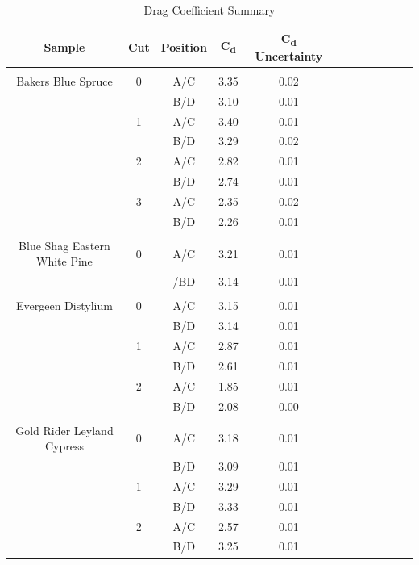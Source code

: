 \documentclass[12pt]{article}
\begin{document}
\begin{table}
\centering
\caption{Drag Coefficient Summary}
\label{tab:SumTable}
	\small
	\begin{tabular}{cccccccccccc}
			\hline
\textbf{Sample}	&	\textbf{Cut}	& 	\textbf{Position}	&	\textbf{C\textsubscript{d}}	&	\textbf{C\textsubscript{d} Uncertainty}	&	\\	\hline
		&		&			&				&						&	\\	
Bakers Blue Spruce	&	0	& 	A/C	&	3.35	&	0.02	&	\\	
	&		& 	B/D	&	3.10	&	0.01	&	\\	
	&	1	& 	A/C	&	3.40	&	0.01	&	\\	
	&		& 	B/D	&	3.29	&	0.02	&	\\	
	&	2	& 	A/C	&	2.82	&	0.01	&	\\	
	&		& 	B/D	&	2.74	&	0.01	&	\\	
	&	3	& 	A/C	&	2.35	&	0.02	&	\\	
	&		& 	B/D	&	2.26	&	0.01	&	\\	
	&		&		&		&		&	\\	
Blue Shag Eastern White Pine	&	0	& 	A/C	&	3.21	&	0.01	&	\\	
	&		& 	/BD	&	3.14	&	0.01	&	\\	
	&		&		&		&		&	\\	
Evergeen Distylium	&	0	& 	A/C	&	3.15	&	0.01	&	\\	
	&		& 	B/D	&	3.14	&	0.01	&	\\	
	&	1	& 	A/C	&	2.87	&	0.01	&	\\	
	&		& 	B/D	&	2.61	&	0.01	&	\\	
	&	2	& 	A/C	&	1.85	&	0.01	&	\\	
	&		& 	B/D	&	2.08	&	0.00	&	\\	
	&		&		&		&		&	\\	
Gold Rider Leyland Cypress	&	0	& 	A/C	&	3.18	&	0.01	&	\\	
	&		& 	B/D	&	3.09	&	0.01	&	\\	
	&	1	& 	A/C	&	3.29	&	0.01	&	\\	
	&		& 	B/D	&	3.33	&	0.01	&	\\	
	&	2	& 	A/C	&	2.57	&	0.01	&	\\	
	&		& 	B/D	&	3.25	&	0.01	&	\\	

\end{tabular}
\end{table}
\end{document}
